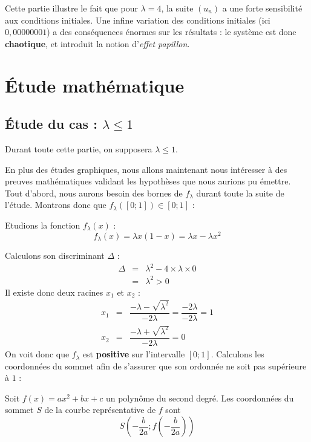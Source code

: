 Cette partie illustre le fait que pour $\lambda = 4$, la suite $(u_n)$ a une forte sensibilité aux conditions initiales. Une infine variation des conditions initiales (ici $0,00000001$) a des conséquences énormes sur les résultats : le système est donc \textbf{chaotique}, et introduit la notion d'\textit{effet papillon}.


\section{\'Etude mathématique}
\subsection{\'Etude du cas : \texorpdfstring{$\lambda \leq 1$}{Lg}}
Durant toute cette partie, on supposera $\lambda \leq 1$.

En plus des études graphiques, nous allons maintenant nous intéresser à des preuves mathématiques validant les hypothèses que nous aurions pu émettre.
Tout d'abord, nous aurons besoin des bornes de $f_\lambda$ durant toute la suite de l'étude. Montrons donc que $f_\lambda([0;1])\in[0;1]$ :

Etudions la fonction $f_\lambda(x)$ :
\[
    f_\lambda(x)=\lambda x(1-x) = \lambda x - \lambda x^2
\]

Calculons son discriminant $\Delta$ :
\[
    \begin{array}{rcl}
        \Delta &=& \lambda^2-4\times\lambda\times 0 \\
        &=& \boxed{\lambda^2 > 0}
    \end{array}
\]
Il existe donc deux racines $x_1$ et $x_2$ :
\[
    \begin{array}{rcl}
        x_1 &=& \dfrac{- \lambda-\sqrt{\lambda^2}}{-2\lambda} = \dfrac{-2\lambda}{-2\lambda} = \boxed{1} \\
        x_2 &=& \dfrac{- \lambda+\sqrt{\lambda^2}}{-2\lambda} = \boxed{0}
    \end{array}
\]
On voit donc que $f_\lambda$ est \textbf{positive} sur l'intervalle $[0;1]$. Calculons les coordonnées du sommet afin de s'assurer que son ordonnée ne soit pas supérieure à $1$ :
\begin{axiome}
    Soit $f(x) = ax^2+bx+c$ un polynôme du second degré. Les coordonnées du sommet $S$ de la courbe représentative de $f$ sont
    \[
          S\left(-\frac{b}{2a};f\left(-\frac{b}{2a}\right)\right)
    \]
\end{axiome}

